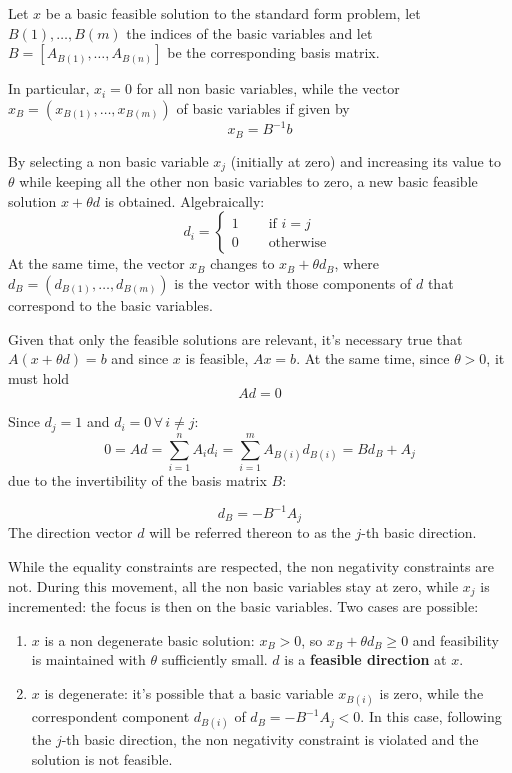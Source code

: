 \documentclass[english]{article}
\begin{document}
\bigskip
Let \(x\) be a basic feasible solution to the standard form problem, let \(B(1), \ldots, B(m)\) the indices of the basic variables and let \(B = \left[ A_{B(1)}, \ldots, A_{B(n)} \right]\) be the corresponding basis matrix.

In particular, \(x_i = 0\) for all non basic variables, while the vector \(x_B = \left( x_{B(1)}, \ldots, x_{B(m)} \right)\) of basic variables if given by
\[x_B = B^{-1}b\]

By selecting a non basic variable \(x_j\) (initially at zero) and increasing its value to \(\theta\) while keeping all the other non basic variables to zero, a new basic feasible solution \(x + \theta d\) is obtained.
Algebraically:
\[ d_i = \begin{cases}
    1 \quad & \text{ if } i = j  \\
    0 \quad & \text{ otherwise }
  \end{cases} \]
At the same time, the vector \(x_B\) changes to \(x_B + \theta d_B\), where \(d_B = (d_{B(1)}, \ldots, d_{B(m)})\) is the vector with those components of \(d\) that correspond to the basic variables.

Given that only the feasible solutions are relevant, it's necessary true that \(A \left( x + \theta d \right) = b\) and since \(x\) is feasible, \(A x = b\).
At the same time, since \(\theta > 0\), it must hold
\begin{equation}
  A d = 0
  \label{eq:feasible-direction-1}
\end{equation}

Since \(d_j = 1\) and \(d_i = 0 \, \forall \, i \neq j\):
\[ 0 = Ad = \displaystyle \sum_{i=1}^n A_i d_i = \sum_{i=1}^{m} A_{B(i)} d_{B(i)} = B d_B + A_j \]
due to the invertibility of the basis matrix \(B\):

\begin{equation}
  d_B = - B^{-1} A_j
  \label{eq:feasible-direction-2}
\end{equation}
The direction vector \(d\) will be referred thereon to as the \(j\)-th basic direction.

While the equality constraints are respected, the non negativity constraints are not.
During this movement, all the non basic variables stay at zero, while \(x_j\) is incremented: the focus is then on the basic variables.
Two cases are possible:

\begin{enumerate}[label=\arabic*., ref=(\arabic*)]
  \item \(x\) is a non degenerate basic solution: \(x_B > 0\), so \(x_B + \theta d_B \geq 0\) and feasibility is maintained with \(\theta\) sufficiently small. \(d\) is a \textbf{feasible direction} at \(x\).
  \item \(x\) is degenerate: it's possible that a basic variable \(x_{B(i)}\) is zero, while the correspondent component \(d_{B(i)}\) of \(d_{B} = -B^{-1}A_j < 0\). In this case, following the \(j\)-th basic direction, the non negativity constraint is violated and the solution is not feasible.
\end{enumerate}
\end{document}
